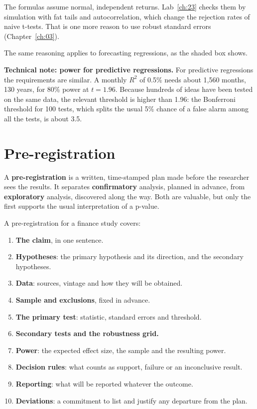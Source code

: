 The formulas assume normal, independent returns. Lab~\ref{ch:23} checks them by simulation with fat tails and autocorrelation, which change the rejection rates of naive t-tests. That is one more reason to use robust standard errors (Chapter~\ref{ch:03}).

The same reasoning applies to forecasting regressions, as the shaded box shows.

\begin{technote}
\textbf{Technical note: power for predictive regressions.} For predictive regressions the requirements are similar. A monthly $R^2$ of 0.5\% needs about 1,560 months, 130 years, for 80\% power at $t = 1.96$. Because hundreds of ideas have been tested on the same data, the relevant threshold is higher than 1.96: the Bonferroni threshold for 100 tests, which splits the usual 5\% chance of a false alarm among all the tests, is about 3.5.
\end{technote}

\section{Pre-registration}
\label{sec:24-prereg}

A \textbf{pre-registration} is a written, time-stamped plan made before the researcher sees the results. It separates \textbf{confirmatory} analysis, planned in advance, from \textbf{exploratory} analysis, discovered along the way. Both are valuable, but only the first supports the usual interpretation of a p-value.

A pre-registration for a finance study covers:

\begin{enumerate}
  \item \textbf{The claim}, in one sentence.
  \item \textbf{Hypotheses}: the primary hypothesis and its direction, and the secondary hypotheses.
  \item \textbf{Data}: sources, vintage and how they will be obtained.
  \item \textbf{Sample and exclusions}, fixed in advance.
  \item \textbf{The primary test}: statistic, standard errors and threshold.
  \item \textbf{Secondary tests and the robustness grid.}
  \item \textbf{Power}: the expected effect size, the sample and the resulting power.
  \item \textbf{Decision rules}: what counts as support, failure or an inconclusive result.
  \item \textbf{Reporting}: what will be reported whatever the outcome.
  \item \textbf{Deviations}: a commitment to list and justify any departure from the plan.
\end{enumerate}

